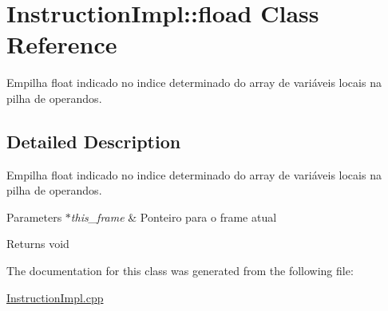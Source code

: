 \hypertarget{class_instruction_impl_1_1fload}{}\section{Instruction\+Impl\+:\+:fload Class Reference}
\label{class_instruction_impl_1_1fload}


Empilha float indicado no indice determinado do array de variáveis locais na pilha de operandos.  




\subsection{Detailed Description}
Empilha float indicado no indice determinado do array de variáveis locais na pilha de operandos. 


\begin{DoxyParams}{Parameters}
{\em $\ast$this\+\_\+frame} & Ponteiro para o frame atual \\
\hline
\end{DoxyParams}
\begin{DoxyReturn}{Returns}
void 
\end{DoxyReturn}


The documentation for this class was generated from the following file\+:\begin{DoxyCompactItemize}
\item 
\hyperlink{_instruction_impl_8cpp}{Instruction\+Impl.\+cpp}\end{DoxyCompactItemize}
